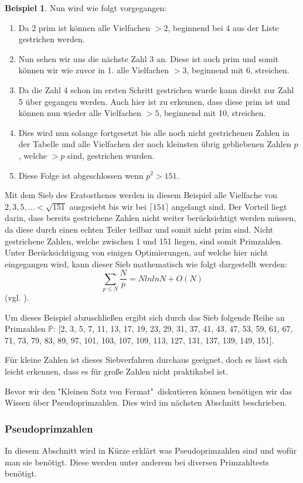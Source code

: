 \documentclass[12pt,a4paper]{article}
\theoremstyle{definition}
\newtheorem{bsp}{Beispiel}[subsection]
\begin{document}
\begin{bsp}
Nun wird wie folgt vorgegangen:
\begin{enumerate}
    \item Da 2 prim ist können alle Vielfachen $>2$, beginnend bei 4 aus der Liste gestrichen werden.
    \item Nun sehen wir uns die nächste Zahl 3 an.
    Diese ist auch prim und somit können wir wie zuvor in 1. alle Vielfachen $>3$, beginnend mit 6, streichen.
    \item Da die Zahl 4 schon im ersten Schritt gestrichen wurde kann direkt zur Zahl 5 über gegangen werden.
    Auch hier ist zu erkennen, dass diese prim ist und können nun wieder alle Vielfachen $>5$, beginnend mit 10, streichen.
    \item Dies wird nun solange fortgesetzt bis alle noch nicht gestrichenen Zahlen in der Tabelle und alle Vielfachen der noch kleinsten übrig gebliebenen Zahlen $p$, welche $>p$ sind, gestrichen wurden.
    \item Diese Folge ist abgeschlossen wenn $p^2 > 151$.
\end{enumerate}
Mit dem Sieb des Eratosthenes werden in diesem Beispiel alle Vielfache von $2, 3, 5, ... < \sqrt{151}$ ausgesiebt bis wir bei $\lceil151\rceil$ angelangt sind.
Der Vorteil liegt darin, dass bereits gestrichene Zahlen nicht weiter berücksichtigt werden müssen, da diese durch einen echten Teiler teilbar und somit nicht prim sind.
Nicht gestrichene Zahlen, welche zwischen 1 und 151 liegen, sind somit Primzahlen.
Unter Berücksichtigung von einigen Optimierungen, auf welche hier nicht eingegangen wird, kann dieser Sieb mathematisch wie folgt dargestellt werden:
\[\sum_{p\le N} \frac{N}p = N ln ln N + O(N)\]
(vgl. \cite[121]{Crandall2005}).

Um dieses Beispiel abzuschließen ergibt sich durch das Sieb folgende Reihe an Primzahlen $\mathbb{P}$: [2, 3, 5, 7, 11, 13, 17, 19, 23, 29, 31, 37, 41, 43, 47, 53, 59, 61, 67, 71, 73, 79, 83, 89, 97, 101, 103, 107, 109, 113, 127, 131, 137, 139, 149, 151].
\end{bsp}
Für kleine Zahlen ist dieses Siebverfahren durchaus geeignet, doch es lässt sich leicht erkennen, dass es für große Zahlen nicht praktikabel ist.

Bevor wir den "Kleinen Satz von Fermat"\ diskutieren können benötigen wir das Wissen über Pseudoprimzahlen.
Dies wird im nächsten Abschnitt beschrieben.

\subsubsection{Pseudoprimzahlen}\label{Pseudoprimzahlen}
In diesem Abschnitt wird in Kürze erklärt was Pseudoprimzahlen sind und wofür man sie benötigt.
Diese werden unter anderem bei diversen Primzahltests benötigt.
\end{document}
